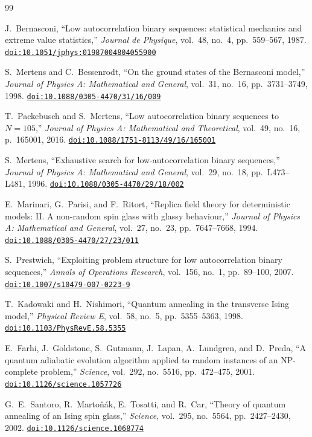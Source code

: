 \documentclass[10pt,twocolumn,a4paper]{article}
\providecommand{\doi}[1]{\href{https://doi.org/#1}{\nolinkurl{doi:#1}}}
\begin{document}
\begin{thebibliography}{99}

J.~Bernasconi,
``Low autocorrelation binary sequences: statistical mechanics and extreme value statistics,''
\emph{Journal de Physique}, vol.~48, no.~4, pp.~559--567, 1987.
\doi{10.1051/jphys:01987004804055900}

S.~Mertens and C.~Bessenrodt,
``On the ground states of the {B}ernasconi model,''
\emph{Journal of Physics A: Mathematical and General}, vol.~31, no.~16, pp.~3731--3749, 1998.
\doi{10.1088/0305-4470/31/16/009}

T.~Packebusch and S.~Mertens,
``Low autocorrelation binary sequences to $N=105$,''
\emph{Journal of Physics A: Mathematical and Theoretical}, vol.~49, no.~16, p.~165001, 2016.
\doi{10.1088/1751-8113/49/16/165001}

S.~Mertens,
``Exhaustive search for low-autocorrelation binary sequences,''
\emph{Journal of Physics A: Mathematical and General}, vol.~29, no.~18, pp.~L473--L481, 1996.
\doi{10.1088/0305-4470/29/18/002}

E.~Marinari, G.~Parisi, and F.~Ritort,
``Replica field theory for deterministic models: II. A non-random spin glass with glassy behaviour,''
\emph{Journal of Physics A: Mathematical and General}, vol.~27, no.~23, pp.~7647--7668, 1994.
\doi{10.1088/0305-4470/27/23/011}

S.~Prestwich,
``Exploiting problem structure for low autocorrelation binary sequences,''
\emph{Annals of Operations Research}, vol.~156, no.~1, pp.~89--100, 2007.
\doi{10.1007/s10479-007-0223-9}

T.~Kadowaki and H.~Nishimori,
``Quantum annealing in the transverse Ising model,''
\emph{Physical Review E}, vol.~58, no.~5, pp.~5355--5363, 1998.
\doi{10.1103/PhysRevE.58.5355}

E.~Farhi, J.~Goldstone, S.~Gutmann, J.~Lapan, A.~Lundgren, and D.~Preda,
``A quantum adiabatic evolution algorithm applied to random instances of an NP-complete problem,''
\emph{Science}, vol.~292, no.~5516, pp.~472--475, 2001.
\doi{10.1126/science.1057726}

G.~E.~Santoro, R.~Marto{\v{n}}{\'a}k, E.~Tosatti, and R.~Car,
``Theory of quantum annealing of an Ising spin glass,''
\emph{Science}, vol.~295, no.~5564, pp.~2427--2430, 2002.
\doi{10.1126/science.1068774}


\end{thebibliography}
\end{document}
